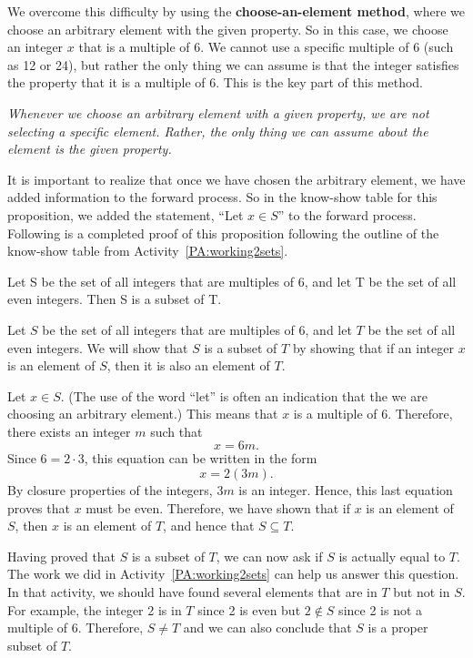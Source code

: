 We overcome this difficulty by using the \textbf{choose-an-element method}, where we choose an arbitrary element with the given property.  So in this case, we choose an integer  $x$  that is a multiple of  6.  We cannot use a specific multiple of 6 (such as 12 or 24), but rather the only thing we can assume is that the integer satisfies the property that it is a multiple of  6.  This is the key part of this method.

\vskip9pt
\begin{center}
\parbox{4in}{\emph{Whenever we choose an arbitrary element with a given property, we are not selecting a specific element.  Rather, the only thing we can assume about the element is the given property.}}
\end{center}
It is important to realize that once we have chosen the arbitrary element, we have added information to the forward process.  So in the know-show table for this proposition, we added the statement, ``Let  $x \in S$''  to the forward process.
Following is a completed proof of this proposition following the outline of the know-show table from \typeu Activity~\ref*{PA:working2sets}.

\begin{proposition} \label{P:SissubsetT}
Let  S  be the set of all integers that are multiples of  6, and let  T  be the set of all even integers.  Then  S  is a subset of  T.
\end{proposition}
%
\begin{myproof}
Let  $S$  be the set of all integers that are multiples of  6, and let  $T$  be the set of all even integers.  We will show that  $S$  is a subset of  $T$ by showing that if an integer $x$ is an element of  $S$, then it is also an element of  $T$.

Let  $x \in S$.  (\note  The use of the word ``let'' is often an indication that the we are choosing an arbitrary element.)  This means that  $x$  is a multiple of  6.  Therefore, there exists an integer  $m$  such that
\[
x = 6m.
\]
Since $6 = 2 \cdot 3$, this equation can be written in the form
\[
x = 2( {3m}).
\]
By closure properties of the integers,  $3m$  is an integer.  Hence, this last equation proves that  $x$  must be even.
Therefore, we have shown that if $x$ is an element of  $S$, then $x$ is an element of  $T$, and hence that  $S \subseteq T$.
\end{myproof}

Having proved that $S$ is a subset of $T$, we can now ask if $S$ is actually equal to $T$.  The work we did in \typeu Activity~\ref*{PA:working2sets} can help us answer this question.  In that activity, we should have found several elements that are in $T$ but not in $S$.  For example, the integer 2 is in $T$ since 2 is even but $2 \notin S$ since 2 is not a multiple of 6.  Therefore, $S \ne T$ and we can also conclude that $S$ is a proper subset of $T$.

